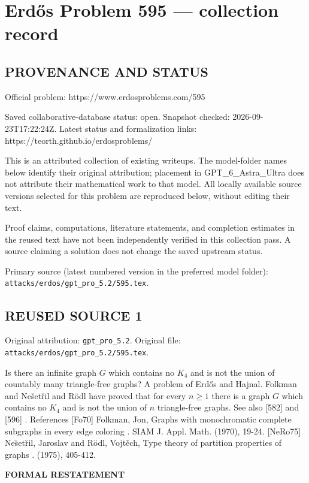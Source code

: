 \section*{Erd\H{o}s Problem 595 --- collection record}

\subsection*{PROVENANCE AND STATUS}
Official problem: https://www.erdosproblems.com/595

Saved collaborative-database status: open.
Snapshot checked: 2026-09-23T17:22:24Z.
Latest status and formalization links: https://teorth.github.io/erdosproblems/

This is an attributed collection of existing writeups. The model-folder names below identify their original attribution; placement in GPT\_6\_Astra\_Ultra does not attribute their mathematical work to that model. All locally available source versions selected for this problem are reproduced below, without editing their text.

Proof claims, computations, literature statements, and completion estimates in the reused text have not been independently verified in this collection pass. A source claiming a solution does not change the saved upstream status.

Primary source (latest numbered version in the preferred model folder): \texttt{attacks/erdos/gpt\_pro\_5.2/595.tex}.

\subsection*{REUSED SOURCE 1}
Original attribution: \texttt{gpt\_pro\_5.2}.
Original file: \texttt{attacks/erdos/gpt\_pro\_5.2/595.tex}.


Is there an infinite graph $G$ which contains no $K_4$ and is not the union of countably many triangle-free graphs? A problem of Erd\H{o}s and Hajnal. Folkman \cite{Fo70} and Ne\v{s}et\v{r}il and R\"{o}dl \cite{NeRo75} have proved that for every $n\geq 1$ there is a graph $G$ which contains no $K_4$ and is not the union of $n$ triangle-free graphs. See also [582] and [596] . References [Fo70] Folkman, Jon, Graphs with monochromatic complete subgraphs in every edge coloring . SIAM J. Appl. Math. (1970), 19-24. [NeRo75] Ne\u set\u ril, Jaroslav and R\"odl, Vojt\v ech, Type theory of partition properties of graphs . (1975), 405-412.

\bigskip
\noindent\textbf{FORMAL RESTATEMENT}

